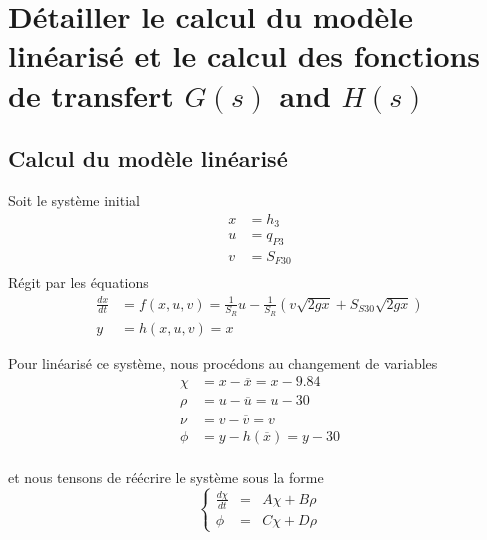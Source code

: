 \documentclass[frenchb, paper=a4, fontsize=11pt]{scrartcl}
\newcommand*\eq[1]{\overline{#1}} 				%
\numberwithin{equation}{section}					%
\numberwithin{figure}{section}					%
\numberwithin{table}{section}						%
\begin{document}
\section{Détailler le calcul du modèle linéarisé et le calcul des fonctions de transfert $G(s)$ and $H(s)$}

\subsection{Calcul du modèle linéarisé}

Soit le système initial
\begin{align}
x &= h_3 \\
u &= q_{P3}\\
v &= S_{F30}\\
\end{align}
Régit par les équations
\begin{align}
\frac{dx}{dt} &= f(x,u,v) = \frac{1}{S_R}u - \frac{1}{S_R}(v\sqrt{2gx} + S_{S30}\sqrt{2gx})\\
y &= h(x,u,v) = x
\end{align}

Pour linéarisé ce système, nous procédons au changement de variables
\begin{align}
\chi &= x-\eq{x} = x - 9.84\\
\rho &= u-\eq{u} = u - 30\\
\nu &= v - \eq{v} = v\\
\phi &= y - h(\eq{x}) = y - 30\\
\end{align}


et nous tensons de réécrire le système sous la forme
\begin{equation}
\left\{ \begin{array}{ccc}
\frac{d\chi}{dt} &=& A\chi + B\rho \\
\phi &=& C\chi + D\rho
\end{array}
\right.
\end{equation}
\end{document}
